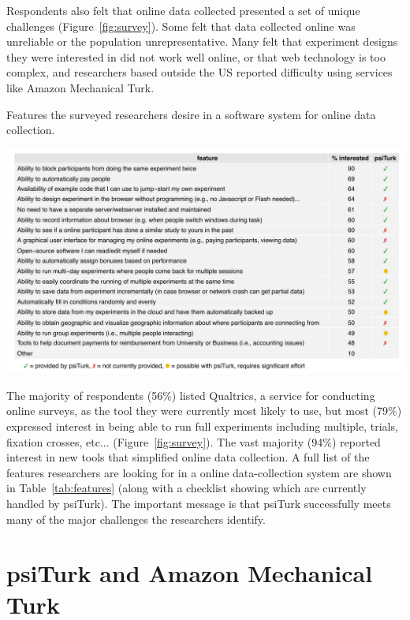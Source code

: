 \documentclass[twocolumn]{svjour3}          %
\begin{document}
Respondents also felt that online data collected presented a set of unique challenges 
(Figure~\ref{fig:survey}).  Some felt that data collected online was unreliable or the
population unrepresentative. Many felt that experiment designs they were interested in did
not work well online, or that web technology is too complex, and researchers based
outside the US reported difficulty using services like Amazon Mechanical Turk.

\begin{table}[tp]
\centering
\caption{Features the surveyed researchers desire in a software system for online data collection.}
\includegraphics[width=\textwidth]{figures/featuresTable.pdf}
\label{tab:features}
\end{table}


The majority of respondents (56\%) listed Qualtrics, a service for conducting online surveys, 
as the tool they were currently most likely to use, but most (79\%) expressed interest in 
being able to run full experiments including multiple, trials, fixation crosses, etc... 
(Figure~\ref{fig:survey}). The vast majority (94\%) reported interest in new tools that 
simplified online data collection. A full list of the features researchers are looking for in a 
online data-collection system are shown in Table~\ref{tab:features} (along with a checklist 
showing which are currently handled by \textsf{psiTurk}).  The important message is that
\textsf{psiTurk} successfully meets many of the major challenges the researchers identify.


\section{psiTurk and Amazon Mechanical Turk} 
\end{document}
